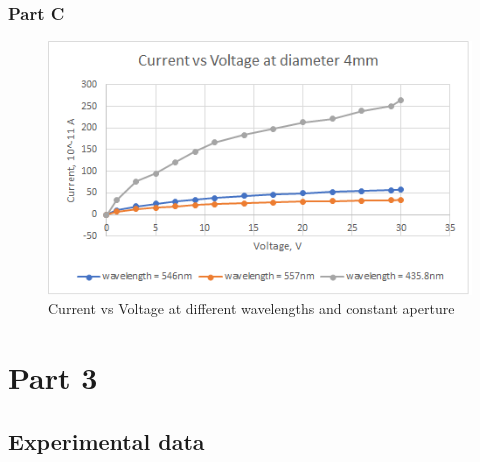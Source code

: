 \documentclass{article}
\begin{document}
\subsubsection{Part C}

 \begin{figure}[H]
    \centering
    \includegraphics[width=.9\linewidth]{part3lab3.png} 
    \caption{Current vs Voltage at different wavelengths and constant aperture}
    \label{fig:calib}
    \end{figure}

\newpage




\section{Part 3}
\subsection{Experimental data}

\paragraph{}
\end{document}
